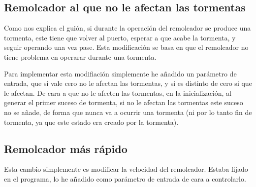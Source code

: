 \documentclass[12pt, spanish]{article}
\begin{document}
\subsection{Remolcador al que no le afectan las tormentas}

Como nos explica el guión, si durante la operación del remolcador se produce una tormenta, este tiene que volver al puerto, esperar a que acabe la tormenta, y seguir operando una vez pase. Esta modificación se basa en que el remolcador no tiene problema en operarar durante una tormenta.

Para implementar esta modifiación simplemente he añadido un parámetro de entrada, que si vale cero no le afectan las tormentas, y si es distinto de cero si que le afectan. De cara a que no le afecten las tormentas, en la inicialización, al generar el primer suceso de tormenta, si no le afectan las tormentas este suceso no se añade, de forma que nunca va a ocurrir una tormenta (ni por lo tanto fin de tormenta, ya que este estado era creado por la tormenta).

\subsection{Remolcador más rápido}

Esta cambio simplemente es modificar la velocidad del remolcador. Estaba fijado en el programa, lo he añadido como parámetro de entrada de cara a controlarlo.
\end{document}
